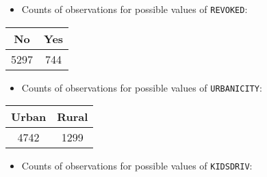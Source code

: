 \documentclass[]{article}
\providecommand{\tightlist}{%
  \setlength{\itemsep}{0pt}\setlength{\parskip}{0pt}}
\begin{document}
\begin{itemize}
\tightlist
\item
  Counts of observations for possible values of \texttt{REVOKED}:
\end{itemize}

\begin{longtable}[]{@{}cc@{}}
\toprule
\begin{minipage}[b]{0.09\columnwidth}\centering\strut
No\strut
\end{minipage} & \begin{minipage}[b]{0.09\columnwidth}\centering\strut
Yes\strut
\end{minipage}\tabularnewline
\midrule
\endhead
\begin{minipage}[t]{0.09\columnwidth}\centering\strut
5297\strut
\end{minipage} & \begin{minipage}[t]{0.09\columnwidth}\centering\strut
744\strut
\end{minipage}\tabularnewline
\bottomrule
\end{longtable}

\begin{itemize}
\tightlist
\item
  Counts of observations for possible values of \texttt{URBANICITY}:
\end{itemize}

\begin{longtable}[]{@{}cc@{}}
\toprule
\begin{minipage}[b]{0.10\columnwidth}\centering\strut
Urban\strut
\end{minipage} & \begin{minipage}[b]{0.10\columnwidth}\centering\strut
Rural\strut
\end{minipage}\tabularnewline
\midrule
\endhead
\begin{minipage}[t]{0.10\columnwidth}\centering\strut
4742\strut
\end{minipage} & \begin{minipage}[t]{0.10\columnwidth}\centering\strut
1299\strut
\end{minipage}\tabularnewline
\bottomrule
\end{longtable}

\begin{itemize}
\tightlist
\item
  Counts of observations for possible values of \texttt{KIDSDRIV}:
\end{itemize}
\end{document}
